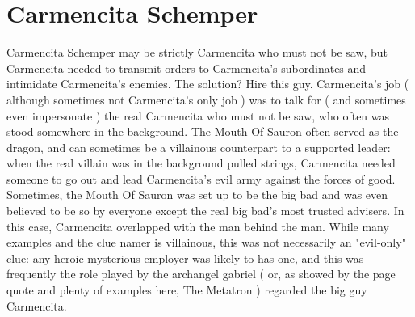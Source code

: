 \documentclass[12pt]{book}
\begin{document}
\chapter{Carmencita Schemper}
Carmencita Schemper may be strictly Carmencita who must not be saw, but Carmencita needed to transmit orders to Carmencita's subordinates and intimidate Carmencita's enemies. The solution? Hire this guy. Carmencita's job ( although sometimes not Carmencita's only job ) was to talk for ( and sometimes even impersonate ) the real Carmencita who must not be saw, who often was stood somewhere in the background. The Mouth Of Sauron often served as the dragon, and can sometimes be a villainous counterpart to a supported leader: when the real villain was in the background pulled strings, Carmencita needed someone to go out and lead Carmencita's evil army against the forces of good. Sometimes, the Mouth Of Sauron was set up to be the big bad and was even believed to be so by everyone except the real big bad's most trusted advisers. In this case, Carmencita overlapped with the man behind the man. While many examples and the clue namer is villainous, this was not necessarily an "evil-only" clue: any heroic mysterious employer was likely to has one, and this was frequently the role played by the archangel gabriel ( or, as showed by the page quote and plenty of examples here, The Metatron ) regarded the big guy Carmencita.
\end{document}
